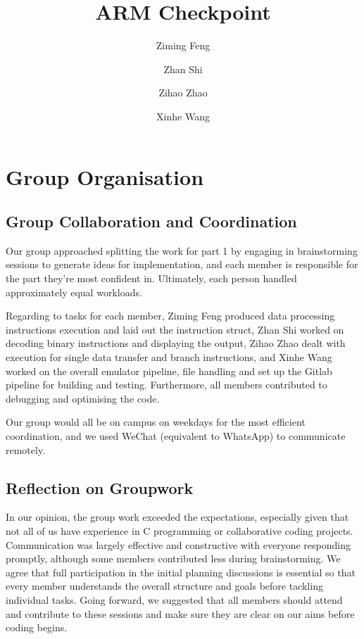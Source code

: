 \documentclass[a4paper, 9pt]{article}
\title{ARM Checkpoint}
\author{Ziming Feng}
\author{Zhan Shi}
\author{Zihao Zhao}
\author{Xinhe Wang}
\affil{Group 38}
\date{}
\begin{document}
\maketitle

\section{Group Organisation}

\subsection{Group Collaboration and Coordination}

Our group approached splitting the work for part 1 by engaging in brainstorming sessions to generate ideas for implementation,
and each member is responsible for the part they're most confident in. Ultimately, each person handled approximately equal workloads.

Regarding to tasks for each member, Ziming Feng produced data processing instructions execution and laid out the instruction struct,
Zhan Shi worked on decoding binary instructions and displaying the output,
Zihao Zhao dealt with execution for single data transfer and branch instructions, and Xinhe Wang worked on the overall emulator pipeline,
file handling and set up the Gitlab pipeline for building and testing.
Furthermore, all members contributed to debugging and optimising the code.

Our group would all be on campus on weekdays for the most efficient coordination, and we used WeChat (equivalent to WhatsApp) to communicate remotely.

\subsection{Reflection on Groupwork}

In our opinion, the group work exceeded the expectations, especially given that not all of us have experience in C programming or collaborative coding projects.
Communication was largely effective and constructive with everyone responding promptly,
although some members contributed less during brainstorming.
We agree that full participation in the initial planning discussions is essential so that every member understands the overall structure and goals before tackling individual tasks.
Going forward, we suggested that all members should attend and contribute to these sessions and make sure they are clear on our aims before coding begins.
\end{document}
